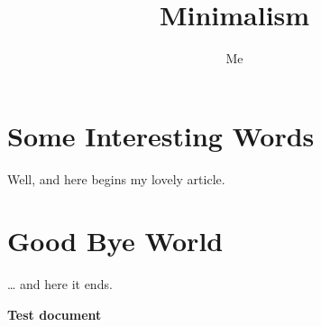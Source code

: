 \documentclass[a4paper,titlepage]{article}
\title{Minimalism}
\author{Me}
\begin{document}


\maketitle
\tableofcontents
\section{Some Interesting Words}
Well, and here begins my lovely article.
\section{Good Bye World}
\ldots{} and here it ends.

\textbf{Test document}
\end{document}
